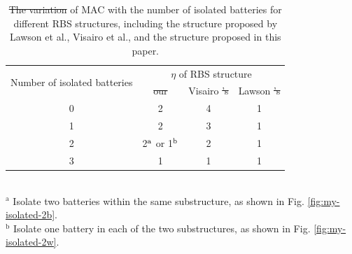 \documentclass{article}
\providecommand{\DIFadd}[1]{{\protect\color{blue}\uwave{#1}}} %
\providecommand{\DIFdel}[1]{{\protect\color{red}\sout{#1}}}                      %
\providecommand{\DIFaddFL}[1]{\DIFadd{#1}} %
\providecommand{\DIFdelFL}[1]{\DIFdel{#1}} %
\providecommand{\DIFaddbeginFL}{} %
\providecommand{\DIFaddendFL}{} %
\providecommand{\DIFdelbeginFL}{} %
\providecommand{\DIFdelendFL}{} %
\newcommand{\DIFscaledelfig}{0.5}
\newlength{\DIFdelgraphicswidth} %
\newlength{\DIFdelgraphicsheight} %
\newcommand{\DIFaddincludegraphics}[2][]{{\color{blue}\fbox{\DIFOincludegraphics[#1]{#2}}}} %
\newcommand{\DIFdelincludegraphics}[2][]{%
\sbox{\DIFdelgraphicsbox}{\DIFOincludegraphics[#1]{#2}}%
\settoboxwidth{\DIFdelgraphicswidth}{\DIFdelgraphicsbox} %
\settoboxtotalheight{\DIFdelgraphicsheight}{\DIFdelgraphicsbox} %
\scalebox{\DIFscaledelfig}{%
\parbox[b]{\DIFdelgraphicswidth}{\usebox{\DIFdelgraphicsbox}\\[-\baselineskip] \rule{\DIFdelgraphicswidth}{0em}}\llap{\resizebox{\DIFdelgraphicswidth}{\DIFdelgraphicsheight}{%
\setlength{\unitlength}{\DIFdelgraphicswidth}%
\begin{picture}(1,1)%
\thicklines\linethickness{2pt} %
{\color[rgb]{1,0,0}\put(0,0){\framebox(1,1){}}}%
{\color[rgb]{1,0,0}\put(0,0){\line( 1,1){1}}}%
{\color[rgb]{1,0,0}\put(0,1){\line(1,-1){1}}}%
\end{picture}%
}\hspace*{3pt}}} %
} %
\DeclareRobustCommand{\DIFaddbeginFL}{\DIFOaddbeginFL \let\includegraphics\DIFaddincludegraphics} %
\DeclareRobustCommand{\DIFaddendFL}{\DIFOaddendFL \let\includegraphics\DIFOincludegraphics} %
\DeclareRobustCommand{\DIFdelbeginFL}{\DIFOdelbeginFL \let\includegraphics\DIFdelincludegraphics} %
\DeclareRobustCommand{\DIFdelendFL}{\DIFOaddendFL \let\includegraphics\DIFOincludegraphics} %
\begin{document}
\begin{table}[htbp]
    \centering
    \caption{
      \DIFdelbeginFL \DIFdelFL{The variation }\DIFdelendFL \DIFaddbeginFL \DIFaddFL{Variation }\DIFaddendFL of MAC with the number of isolated batteries for different RBS structures, including the structure proposed by Lawson et al., Visairo et al., and the structure proposed in this paper.
      }
      \label{tab:isolated_mac}
      \begin{tabular}{cccc}
      \toprule
      \DIFdelbeginFL %
\DIFdelendFL \DIFaddbeginFL \multirow{2}[4]{*}{Number of isolated batteries} \DIFaddendFL & \multicolumn{3}{c}{$\eta$ of RBS structure} \\
  \cmidrule{2-4}          & \DIFdelbeginFL \DIFdelFL{our  }\DIFdelendFL \DIFaddbeginFL \DIFaddFL{This paper  }\DIFaddendFL & Visairo  \DIFdelbeginFL \DIFdelFL{'s  }\DIFdelendFL & Lawson  \DIFdelbeginFL \DIFdelFL{'s  }\DIFdelendFL \\
      \midrule
      0     & 2     & 4     & 1 \\
      1     & 2     & 3     & 1 \\
      2     & 2\DIFdelbeginFL \DIFdelFL{$^{\rm a}$ }\DIFdelendFL \DIFaddbeginFL \DIFaddFL{$^{\mathrm{a}}$ }\DIFaddendFL or 1\DIFdelbeginFL \DIFdelFL{$^{\rm b}$ }\DIFdelendFL \DIFaddbeginFL \DIFaddFL{$^{\mathrm{b}}$ }\DIFaddendFL & 2     & 1 \\
      3     & 1     & 1     & 1 \\
      \bottomrule
      \end{tabular}
      \\
      \DIFdelbeginFL %
\DIFdelendFL \DIFaddbeginFL \footnotesize{$^{\mathrm{a}}$ Isolate two batteries within the same substructure, as shown in Fig. \ref{fig:my-isolated-2b}.}\DIFaddendFL \\
      \DIFdelbeginFL %
\DIFdelendFL \DIFaddbeginFL \footnotesize{$^{\mathrm{b}}$ Isolate one battery in each of the two substructures, as shown in Fig. \ref{fig:my-isolated-2w}.}
  \DIFaddendFL \end{table}
\end{document}
